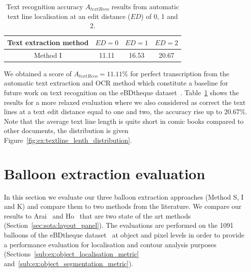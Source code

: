   \begin{table}[ht]
    \centering
    \caption[Text recognition accuracy results from automatic text line localisation using edit distance]{Text recognition accuracy $A_{textReco}$ results from automatic text line localisation at an edit distance ($ED$) of 0, 1 and 2.}
    \begin{tabular}{|c|c|c|c|}
          \hline
          Text extraction method &  $ED=0$  & $ED=1$  & $ED=2$  \\
          \hline
          Method I  &  11.11  & 16.53     & 20.67       \\
          \hline
        \end{tabular}
    \label{tab:ex:text_recogniton_results}
  \end{table}%

We obtained a score of $A_{textReco}=11.11\%$ for perfect transcription from the automatic text extraction and OCR method which constitute a baseline for future work on text recognition on the eBDtheque dataset~\cite{Guerin2013}.
Table~\ref{tab:ex:text_recogniton_results} shows the results for a more relaxed evaluation where we also considered as correct the text lines at a text edit distance equal to one and two, the accuracy rise up to 20.67\%.
Note that the average text line length is quite short in comic books compared to other documents, the distribution is given Figure~\ref{fig:ex:textline_lenth_distribution}.




\section{Balloon extraction evaluation} %
\label{sub:ex:balloon_extraction_evaluation}
In this section we evaluate our three balloon extraction approaches (Method S, I and K) and compare them to two methods from the literature.
We compare our results to Arai~\cite{Arai10} and Ho~\cite{Ho2012} that are two state of the art methods (Section~\ref{sec:sota:layout_panel}).
The evaluations are performed on the 1091 balloons of the eBDtheque dataset~\cite{Guerin2013} at object and pixel levels in order to provide a performance evaluation for localisation and contour analysis purposes (Sections~\ref{sub:ex:object_localisation_metric} and~\ref{sub:ex:object_segmentation_metric}).

